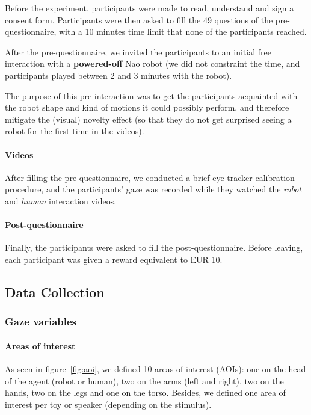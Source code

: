 \documentclass[lettersize, noapacite, twoside, HRI]{apa_HRI}
\begin{document}
Before the experiment, participants were made to read, understand and sign a
consent form. Participants were then asked to fill the 49 questions of
the pre-questionnaire, with a 10 minutes time limit that none of the participants
reached.

After the pre-questionnaire, we invited the participants to an initial
free interaction with a \textbf{powered-off} Nao robot (we did not constraint
the time, and participants played between 2 and 3 minutes with the robot).

The purpose of this pre-interaction was to get the participants acquainted with the
robot shape and kind of motions it could possibly perform, and therefore
mitigate the (visual) novelty effect (so that they do not get surprised seeing
a robot for the first time in the videos).

\paragraph{Videos}

After filling the pre-questionnaire, we conducted a brief eye-tracker
calibration procedure, and the participants' gaze was recorded while they
watched the \emph{robot} and \emph{human} interaction videos.

\paragraph{Post-questionnaire}

Finally, the participants were asked to fill the post-questionnaire.
Before leaving, each participant was given a reward
equivalent to EUR 10.

\subsection{Data Collection}

\subsubsection{Gaze variables}

\paragraph{Areas of interest}

As seen in figure~\ref{fig:aoi}, we defined 10 areas of interest (AOIs): one on
the head of the agent (robot or human), two on the arms (left and right), two on
the hands, two on the legs and one on the torso. Besides, we defined one area of
interest per toy or speaker (depending on the stimulus).
\end{document}
